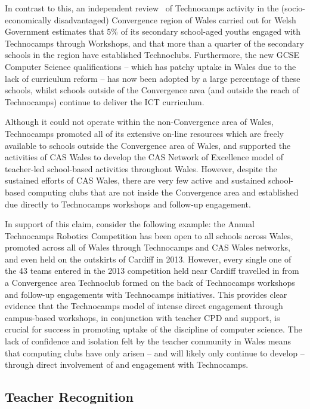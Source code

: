 \documentclass{sig-alternate}
\begin{document}
In contrast to this, an independent review~\cite{Wavehill:2015} of
Technocamps activity in the (socio-economically disadvantaged)
Convergence region of Wales carried out for Welsh Government estimates
that 5\% of its secondary school-aged youths
engaged with Technocamps through Workshops, and that more than a
quarter of the secondary schools in the region have established
Technoclubs.  Furthermore, the new GCSE Computer Science
qualifications -- which has patchy uptake in Wales due to the lack of
curriculum reform -- has now been adopted by a large percentage of
these schools, whilst schools outside of the Convergence area (and
outside the reach of Technocamps) continue to deliver the ICT
curriculum.

Although it could not operate within the non-Convergence area of
Wales, Technocamps promoted all of its extensive on-line resources
which are freely available to schools outside the Convergence area of
Wales, and supported the activities of CAS Wales to develop the CAS
Network of Excellence model of teacher-led school-based activities
throughout Wales. However, despite the sustained efforts of CAS
Wales, there are very few active and sustained school-based computing
clubs that are not inside the Convergence area and established due
directly to Technocamps workshops and follow-up engagement.

In support of this claim, consider the following example: the Annual
Technocamps Robotics Competition has been open to all schools across
Wales, promoted across all of Wales through Technocamps and CAS Wales
networks, and even held on the outskirts of Cardiff in 2013.  However,
every single one of the 43 teams entered in the 2013 competition held
near Cardiff travelled in from a Convergence area Technoclub formed on
the back of Technocamps workshops and follow-up engagements with
Technocamps initiatives. This provides clear evidence that the
Technocamps model of intense direct engagement through campus-based
workshops, in conjunction with teacher CPD and support, is crucial for
success in promoting uptake of the discipline of computer science. The
lack of confidence and isolation felt by the teacher community in
Wales means that computing clubs have only arisen -- and will likely
only continue to develop -- through direct involvement of and
engagement with Technocamps.

\subsection{Teacher Recognition}\label{teacherrecog}
\end{document}
